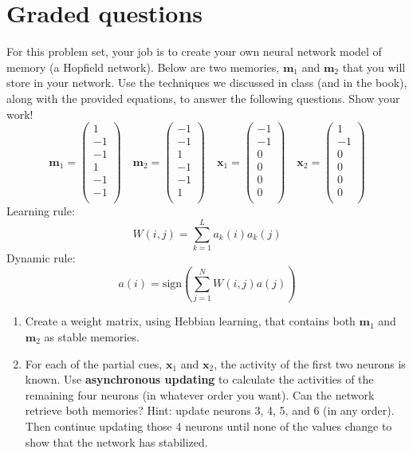 \documentclass[11pt]{article}
\begin{document}
\section*{Graded questions}

For this problem set, your job is to create your own neural
  network model of memory (a Hopfield network).  Below are two
  memories, $\mathbf{m}_1$ and $\mathbf{m}_2$ that you will store in
  your network.  Use the techniques we discussed in class (and in
  the book), along with the provided equations, to answer the
  following questions.  Show your work!
\[
  \mathbf{m}_1=
  \begin{pmatrix}
    1\\
    -1\\
    -1\\
    1\\
    -1\\
    -1\\
  \end{pmatrix}\quad
  \mathbf{m}_2=
  \begin{pmatrix}
    -1\\
    -1\\
    1\\
    -1\\
    -1\\
    1\\
  \end{pmatrix}\quad
\mathbf{x}_1=
  \begin{pmatrix}
    -1\\
    -1\\
    0\\
    0\\
    0\\
    0\\
  \end{pmatrix}\quad
\mathbf{x}_2=
  \begin{pmatrix}
    1\\
    -1\\
    0\\
    0\\
    0\\
    0\\
  \end{pmatrix}
\]
Learning rule:
\[
W(i,j) = \sum_{k = 1}^L a_k(i)a_k(j)
\]
Dynamic rule:
\[
a(i) = \mathrm{sign}\left(\sum_{j=1}^N W(i,j)a(j)\right)
\]

\begin{enumerate}
\item Create a weight matrix, using Hebbian learning, that contains
  both $\mathbf{m}_1$ and $\mathbf{m}_2$ as stable memories.

\item For each of the partial cues, $\mathbf{x}_1$ and $\mathbf{x}_2$,
  the activity of the first two neurons is known.  Use
  \textbf{asynchronous updating} to calculate the activities of the
  remaining four neurons (in whatever order you want).  Can the
  network retrieve both memories?  Hint: update neurons 3, 4, 5, and 6
  (in any order).  Then continue updating those 4 neurons until none of the
  values change to show that the network has stabilized.
\end{enumerate}
\end{document}
